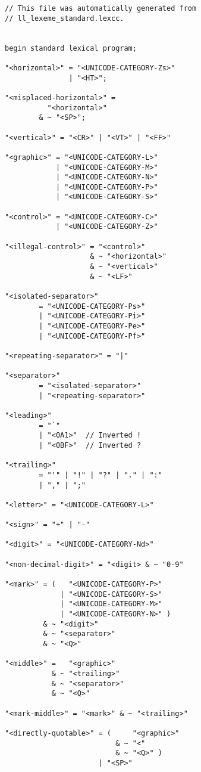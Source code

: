\documentclass[12pt]{article}
\newenvironment{indpar}[1][0.3in]%
	{\begin{list}{}%
		     {\setlength{\itemsep}{0in}%
		      \setlength{\topsep}{0in}%
		      \setlength{\parsep}{1ex}%
		      \setlength{\labelwidth}{#1}%
		      \setlength{\leftmargin}{#1}%
		      \addtolength{\leftmargin}{\labelsep}}%
	 \item}%
	{\end{list}}
\begin{document}
\begin{indpar}
\begin{verbatim}
// This file was automatically generated from
// ll_lexeme_standard.lexcc.


begin standard lexical program;

"<horizontal>" = "<UNICODE-CATEGORY-Zs>"
               | "<HT>";

"<misplaced-horizontal>" =
          "<horizontal>"
        & ~ "<SP>";

"<vertical>" = "<CR>" | "<VT>" | "<FF>"

"<graphic>" = "<UNICODE-CATEGORY-L>"
            | "<UNICODE-CATEGORY-M>"
            | "<UNICODE-CATEGORY-N>"
            | "<UNICODE-CATEGORY-P>"
            | "<UNICODE-CATEGORY-S>"

"<control>" = "<UNICODE-CATEGORY-C>"
            | "<UNICODE-CATEGORY-Z>"

"<illegal-control>" = "<control>"
                    & ~ "<horizontal>"
                    & ~ "<vertical>"
                    & ~ "<LF>"

"<isolated-separator>"
        = "<UNICODE-CATEGORY-Ps>"
        | "<UNICODE-CATEGORY-Pi>"
        | "<UNICODE-CATEGORY-Pe>"
        | "<UNICODE-CATEGORY-Pf>"

"<repeating-separator>" = "|"

"<separator>"
        = "<isolated-separator>"
        | "<repeating-separator>"

"<leading>"
        = "`"
        | "<0A1>"  // Inverted !
        | "<0BF>"  // Inverted ?

"<trailing>"
        = "'" | "!" | "?" | "." | ":"
        | "," | ";"

"<letter>" = "<UNICODE-CATEGORY-L>"

"<sign>" = "+" | "-"

"<digit>" = "<UNICODE-CATEGORY-Nd>"

"<non-decimal-digit>" = "<digit> & ~ "0-9"

"<mark>" = (   "<UNICODE-CATEGORY-P>"
             | "<UNICODE-CATEGORY-S>"
             | "<UNICODE-CATEGORY-M>"
             | "<UNICODE-CATEGORY-N>" )
         & ~ "<digit>"
         & ~ "<separator>"
         & ~ "<Q>"

"<middle>" =   "<graphic>"
           & ~ "<trailing>"
           & ~ "<separator>"
           & ~ "<Q>"

"<mark-middle>" = "<mark>" & ~ "<trailing>"

"<directly-quotable>" = (     "<graphic>"
                          & ~ "<"
                          & ~ "<Q>" )
                      | "<SP>"


\end{verbatim}
\end{indpar}
\end{document}

